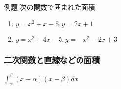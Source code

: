 \documentclass[10pt,dvipdfmx]{jsarticle}
\begin{document}
\begin{itembox}[l]{例題}
  次の関数で囲まれた面積
  \begin{large}
    \begin{enumerate}
      \item $y=x^2+x-5, y=2x+1$
      \item $y=x^2+4x-5, y=-x^2-2x+3$
    \end{enumerate}
  \end{large}
\end{itembox}

\subsubsection*{二次関数と直線などの面積}
$\int_{\alpha}^{\beta}(x-\alpha)(x-\beta)dx$
\vspace{10mm}
\end{document}
